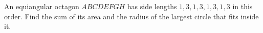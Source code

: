 An equiangular octagon $ABCDEFGH$ has side lengths $1,3,1,3,1,3,1,3$ in this order. Find the sum of its area and the radius of the largest circle that fits inside it.
